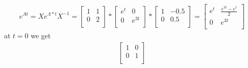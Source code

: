 \documentclass[a4paper,11pt]{article}
\begin{document}
\begin{align*}
e^{At}=X e^{\Lambda*t} X^{-1}= 
\begin{bmatrix}
1 & 1 \\
0 & 2 \\
\end{bmatrix}
*
\begin{bmatrix}
e^t & 0 \\
0 & e^{3t} \\
\end{bmatrix}
*
\begin{bmatrix}
1 & -0.5 \\
0 & 0.5 \\
\end{bmatrix}= 
\begin{bmatrix}
e^t & \frac{e^{3t}-e^t}{2} \\
0 & e^{3t} \\
\end{bmatrix}
\end{align*}
at $t=0$ we get
\begin{align*}
\begin{bmatrix}
1 & 0 \\
0 & 1 \\
\end{bmatrix}
\end{align*}
\end{document}
